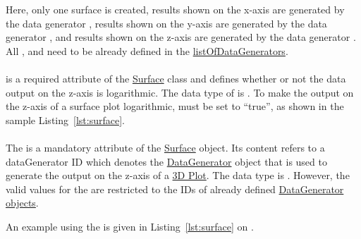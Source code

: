 Here, only one surface is created, results shown on the x-axis are generated by the data generator , results shown on the y-axis are generated by the data generator , and results shown on the z-axis are generated by the data generator . All ,  and  need to be already defined in the \hyperref[sec:listOfDataGenerators]{listOfDataGenerators}.


\paragraph{}
\label{sec:logZ}
 is a required attribute of the \hyperref[class:surface]{Surface} class and defines whether or not the data output on the z-axis is logarithmic. The data type of  is .
To make the output on the z-axis of a surface plot logarithmic,  must be set to ``true'', as shown in the sample Listing~\ref{lst:surface}.

\paragraph{}
\label{sec:zDataReference}
The  is a mandatory attribute of the \hyperref[class:surface]{Surface} object. Its content refers to a dataGenerator ID which denotes the \hyperref[class:dataGenerator]{DataGenerator} object that is used to generate the output on the z-axis of a \hyperref[class:plot3D]{3D Plot}.
The  data type is . However, the valid values for the  are restricted to the IDs of already defined \hyperref[class:dataGenerator]{DataGenerator objects}.

An example using the  is given in Listing~\ref{lst:surface} on .
